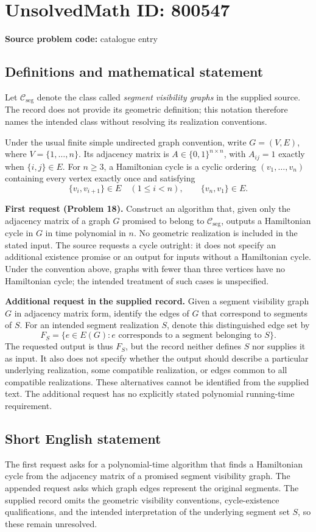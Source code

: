\documentclass[11pt]{article}
\begin{document}
\section*{UnsolvedMath ID: 800547}
\textbf{Source problem code:} catalogue entry
\subsection{Definitions and mathematical statement}
Let \(\mathcal C_{\mathrm{seg}}\) denote the class called \emph{segment visibility graphs} in the supplied source. The record does not provide its geometric definition; this notation therefore names the intended class without resolving its realization conventions.

Under the usual finite simple undirected graph convention, write \(G=(V,E)\), where \(V=\{1,\ldots,n\}\). Its adjacency matrix is \(A\in\{0,1\}^{n\times n}\), with \(A_{ij}=1\) exactly when \(\{i,j\}\in E\). For \(n\geq 3\), a Hamiltonian cycle is a cyclic ordering \((v_1,\ldots,v_n)\) containing every vertex exactly once and satisfying
\[
\{v_i,v_{i+1}\}\in E\quad(1\leq i<n),\qquad \{v_n,v_1\}\in E.
\]

\textbf{First request (Problem 18).} Construct an algorithm that, given only the adjacency matrix of a graph \(G\) promised to belong to \(\mathcal C_{\mathrm{seg}}\), outputs a Hamiltonian cycle in \(G\) in time polynomial in \(n\). No geometric realization is included in the stated input. The source requests a cycle outright: it does not specify an additional existence promise or an output for inputs without a Hamiltonian cycle. Under the convention above, graphs with fewer than three vertices have no Hamiltonian cycle; the intended treatment of such cases is unspecified.

\textbf{Additional request in the supplied record.} Given a segment visibility graph \(G\) in adjacency matrix form, identify the edges of \(G\) that correspond to segments of \(S\). For an intended segment realization \(S\), denote this distinguished edge set by
\[
F_S=\{e\in E(G):e\text{ corresponds to a segment belonging to }S\}.
\]
The requested output is thus \(F_S\), but the record neither defines \(S\) nor supplies it as input. It also does not specify whether the output should describe a particular underlying realization, some compatible realization, or edges common to all compatible realizations. These alternatives cannot be identified from the supplied text. The additional request has no explicitly stated polynomial running-time requirement.
\subsection{Short English statement}
The first request asks for a polynomial-time algorithm that finds a Hamiltonian cycle from the adjacency matrix of a promised segment visibility graph. The appended request asks which graph edges represent the original segments. The supplied record omits the geometric visibility conventions, cycle-existence qualifications, and the intended interpretation of the underlying segment set \(S\), so these remain unresolved.
\end{document}
